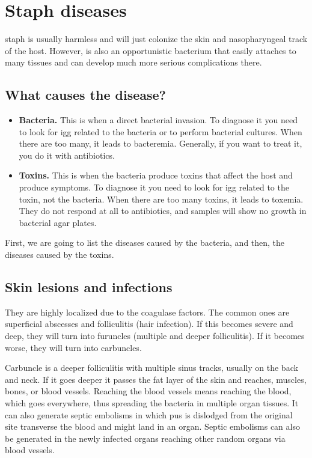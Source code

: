 \section{Staph diseases}

\gls{staph} is usually harmless and will just colonize the skin and nasopharyngeal track of the host. However, is also an opportunistic bacterium that easily attaches to many tissues and can develop much more serious complications there.

\subsection{What causes the disease?}

\begin{itemize}

    \item \textbf{Bacteria.} This is when a direct bacterial invasion. To diagnose it you need to look for \gls{igg} related to the bacteria or to perform bacterial cultures. When there are too many, it leads to bacteremia. Generally, if you want to treat it, you do it with antibiotics.
    
    \item \textbf{Toxins.} This is when the bacteria produce toxins that affect the host and produce symptoms. To diagnose it you need to look for \gls{igg} related to the toxin, not the bacteria. When there are too many toxins, it leads to toxemia. They do not respond at all to antibiotics, and samples will show no growth in bacterial agar plates.

\end{itemize}

First, we are going to list the diseases caused by the bacteria, and then, the diseases caused by the toxins.

\subsection{Skin lesions and infections}

They are highly localized due to the coagulase factors. The common ones are superficial abscesses and folliculitis (hair infection). If this becomes severe and deep, they will turn into furuncles (multiple and deeper folliculitis). If it becomes worse, they will turn into carbuncles.

Carbuncle is a deeper folliculitis with multiple sinus tracks, usually on the back and neck. If it goes deeper it passes the fat layer of the skin and reaches, muscles, bones, or blood vessels. Reaching the blood vessels means reaching the blood, which goes everywhere, thus spreading the bacteria in multiple organ tissues. It can also generate septic embolisms in which pus is dislodged from the original site transverse the blood and might land in an organ. Septic embolisms can also be generated in the newly infected organs reaching other random organs via blood vessels.

